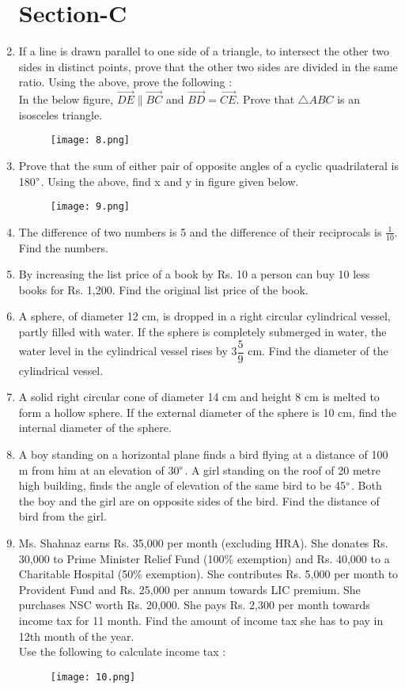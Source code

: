 \documentclass[journal,12pt,twocolumn]{IEEEtran}
\begin{document}
\begin{enumerate}
 \section{Section-C}
 \item If a line is drawn parallel to one side of a triangle, to intersect the other two sides in distinct points, prove that the other two sides are divided in the same ratio. Using the above, prove the following :\\ In the below figure, $\vec{DE} \| \vec{BC}$ and $\vec{BD}=\vec{CE}$. Prove that $\triangle{ABC}$ is an isosceles triangle.
 \begin{figure}[h!]
    \centering
    \texttt{[image: 8.png]}
 \end{figure}
 \medskip
 \item Prove that the sum of either pair of opposite angles of a cyclic quadrilateral is 180$\degree$. Using the above, find x and y in figure given below.
 \begin{figure}[h!]
    \centering
    \texttt{[image: 9.png]}
 \end{figure}
 \medskip
 \item The difference of two numbers is 5 and the difference of their reciprocals is $\displaystyle\frac{1}{10}$. Find the numbers.
 \medskip
\item  By increasing the list price of a book by Rs. 10 a person can buy 10 less books for Rs. 1,200. Find the original list price of the book.
\medskip
\item A sphere, of diameter 12 cm, is dropped in a right circular cylindrical vessel, partly filled with water. If the sphere is completely submerged in water, the water level in the cylindrical vessel rises by {3}$\dfrac{5}{9}$ cm. Find the diameter of the cylindrical vessel.
\medskip
\item A solid right circular cone of diameter 14 cm and height 8 cm is melted to form a hollow sphere. If the external diameter of the sphere is 10 cm, find the internal diameter of the sphere.
\medskip
\item A boy standing on a horizontal plane finds a bird flying at a distance of 100 m from him at an elevation of 30$\degree$. A girl standing on the roof of 20 metre high building, finds the angle of elevation of the same bird to be 45$\degree$. Both the boy and the girl are on opposite sides of the bird. Find the distance of bird from the girl.
\medskip
\item Ms. Shahnaz earns Rs. 35,000 per month (excluding HRA). She donates Rs. 30,000 to Prime Minister Relief Fund (100\% exemption) and Rs. 40,000 to a Charitable Hospital (50\% exemption). She contributes Rs. 5,000 per month to Provident Fund and Rs. 25,000 per annum towards LIC premium. She purchases NSC worth Rs. 20,000. She pays Rs. 2,300 per month towards income tax for 11 month. Find the amount of income tax she has to pay in 12th month of the year.\\
Use the following to calculate income tax :\\
\begin{figure}[h!]
    \centering
    \texttt{[image: 10.png]}
 \end{figure}
 \end{enumerate}
\end{document}

